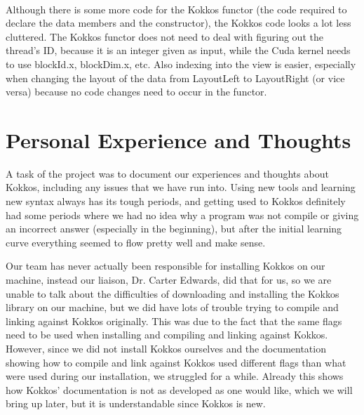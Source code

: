 \\
Although there is some more code for the Kokkos functor (the code required to
declare the data members and the constructor), the Kokkos code looks a lot less
cluttered. The Kokkos functor does not need to deal with figuring out the
thread's ID, because it is an integer given as input, while the Cuda kernel
needs to use blockId.x, blockDim.x, etc. Also indexing into the view is easier,
especially when changing the layout of the data from LayoutLeft to LayoutRight
(or vice versa) because no code changes need to occur in the functor.


\section{Personal Experience and Thoughts}
% 
A task of the project was to document our experiences and thoughts about Kokkos, including any issues that we have run into. Using new tools and learning new syntax always has its tough periods, and getting used to Kokkos definitely had some periods where we had no idea why a program was not compile or giving an incorrect answer (especially in the beginning), but after the initial learning curve everything seemed to flow pretty well and make sense. 

Our team has never actually been responsible for installing Kokkos on our machine, instead our liaison, Dr. Carter Edwards, did that for us, so we are unable to talk about the difficulties of downloading and installing the Kokkos library on our machine, but we did have lots of trouble trying to compile and linking against Kokkos originally. This was due to the fact that the same flags need to be used when installing and compiling and linking against Kokkos. However, since we did not install Kokkos ourselves and the documentation showing how to compile and link against Kokkos used different flags than what were used during our installation, we struggled for a while. Already this shows how Kokkos' documentation is not as developed as one would like, which we will bring up later, but it is understandable since Kokkos is new. 


